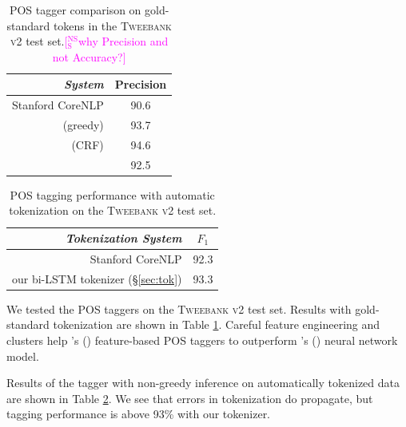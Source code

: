 \documentclass[11pt,a4paper]{article}
\newcommand{\citeposs}[2][]{\citeauthor{#2}'s (\citeyear[#1]{#2})}
\newcommand{\nss}[1]{\textcolor{magenta}{[$_\mathrm{S}^\mathrm{NS}$#1]}}
\begin{document}
\begin{table}[t]
	\centering
	\begin{tabular}{rc}
		\it System & Precision \\
		\hline
		Stanford CoreNLP & 90.6 \\
		\citealp{owoputi-EtAl:2013:NAACL-HLT} (greedy) & 93.7 \\
		\citealp{owoputi-EtAl:2013:NAACL-HLT} (CRF) & 94.6 \\
		\hdashline
		\citealp{ma-hovy:2016:P16-1} & 92.5 \\
	\end{tabular}
	\caption{POS tagger comparison on gold-standard tokens in the
          \textsc{Tweebank v2} test set.\nss{why Precision and not Accuracy?} \label{tbl:pos-result}}
\end{table}

\begin{table}[t]
	\centering
	\begin{tabular}{rc}
		\it Tokenization System & $F_1$ \\
		\hline
		Stanford CoreNLP & 92.3 \\
		our bi-LSTM tokenizer (\S\ref{sec:tok}) & 93.3 \\
	\end{tabular}
	\caption{\citet{owoputi-EtAl:2013:NAACL-HLT} POS tagging performance with automatic tokenization on
          the \textsc{Tweebank v2} test set. \label{tbl:pos-result-vs-tok}}
\end{table}

We tested the POS taggers on the \textsc{Tweebank v2} test set.  Results
with gold-standard tokenization are shown in
Table \ref{tbl:pos-result}. Careful feature engineering and 
\citet{Brown:1992:CNG:176313.176316} clusters  
help \citeposs{owoputi-EtAl:2013:NAACL-HLT} feature-based POS taggers to outperform \citeposs{ma-hovy:2016:P16-1} neural network
model. 

Results of the \citet{owoputi-EtAl:2013:NAACL-HLT}  tagger with non-greedy
inference on automatically tokenized data
are shown in  Table \ref{tbl:pos-result-vs-tok}.  We see that errors
in tokenization do propagate, but tagging performance is above 93\%
with our tokenizer. 
\end{document}
